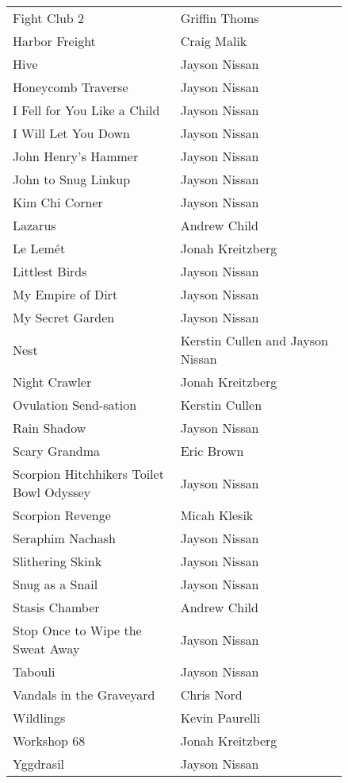 \begin{flushleft}
\begin{center}
\begin{supertabular}{p{0.42\linewidth}p{0.42\linewidth}}
Fight Club 2 & Griffin Thoms\\
Harbor Freight & Craig Malik\\
Hive & Jayson Nissan\\
Honeycomb Traverse & Jayson Nissan\\
I Fell for You Like a Child & Jayson Nissan\\
I Will Let You Down & Jayson Nissan\\
John Henry's Hammer & Jayson Nissan\\
John to Snug Linkup & Jayson Nissan\\
Kim Chi Corner & Jayson Nissan\\
Lazarus & Andrew Child\\
Le Lemét & Jonah Kreitzberg\\
Littlest Birds & Jayson Nissan\\
My Empire of Dirt & Jayson Nissan\\
My Secret Garden & Jayson Nissan\\
Nest & Kerstin Cullen and Jayson Nissan\\
Night Crawler & Jonah Kreitzberg\\
Ovulation Send-sation & Kerstin Cullen\\
Rain Shadow & Jayson Nissan\\
Scary Grandma & Eric Brown\\
Scorpion Hitchhikers Toilet Bowl Odyssey & Jayson Nissan\\
Scorpion Revenge & Micah Klesik\\
Seraphim Nachash & Jayson Nissan\\
Slithering Skink & Jayson Nissan\\
Snug as a Snail & Jayson Nissan\\
Stasis Chamber & Andrew Child\\
Stop Once to Wipe the Sweat Away & Jayson Nissan\\
Tabouli & Jayson Nissan\\
Vandals in the Graveyard & Chris Nord\\
Wildlings & Kevin Paurelli\\
Workshop 68 & Jonah Kreitzberg\\
Yggdrasil & Jayson Nissan\\
\end{supertabular}
\end{center}

\end{flushleft}
\onecolumn
\clearpage